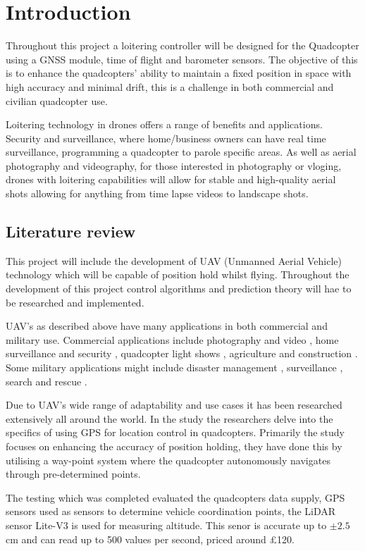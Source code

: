 \documentclass{report}
\begin{document}
\chapter{Introduction}
Throughout this project a loitering controller will be designed for the
Quadcopter using a GNSS module, time of flight and barometer sensors. The objective of this is to enhance the quadcopters' ability to maintain a fixed position in space with high accuracy and minimal drift, this is a challenge in both commercial and civilian quadcopter use.

Loitering technology in drones offers a range of benefits and applications.
Security and surveillance, where home/business owners can have real time
surveillance, programming a quadcopter to parole specific areas. As well as
aerial photography and videography, for those interested in photography or
vloging, drones with loitering capabilities will allow for stable and
high-quality aerial shots allowing for anything from time lapse videos to
landscape shots.

\section{Literature review}
This project will include the development of UAV (Unmanned Aerial
Vehicle) technology which will be capable of position hold whilst flying.
Throughout the development of this project control algorithms and prediction theory will hae to be researched and implemented.

UAV's as described above have many applications in both commercial and military
use. Commercial applications include photography and video
\cite{photographyAndVideo}, home surveillance and security \cite{security},
quadcopter light shows \cite{lightShow}, agriculture \cite{agricultural} and
construction \cite{construction}. Some military applications might include
disaster management \cite{disasterManagement}, surveillance \cite{surveillance},
search and rescue \cite{searchAndRescue}.

Due to UAV's wide range of adaptability and use cases it has been researched
extensively all around the world. In the study \cite{Widhianto2023Quadcopter}
the researchers delve into the specifics of using GPS for location control in
quadcopters. Primarily the study focuses on enhancing the accuracy of position
holding, they have done this by utilising a way-point system where the
quadcopter autonomously navigates through pre-determined points.

The testing which was completed evaluated the quadcopters data supply, GPS
sensors used as sensors to determine vehicle coordination points, the LiDAR
sensor Lite-V3 is used for measuring altitude. This senor is accurate up to \(\pm 2.5\)cm and can read up to 500 values per second, priced around £120.
\end{document}
